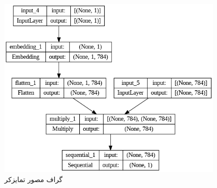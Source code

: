 \documentclass{article}
\begin{document}
\begin{figure}[!h]
    \centering\includegraphics[scale=.55]{./dis-1}
    \caption{گراف مصور تمایزکر}\label{fig.33}
\end{figure}
\end{document}
